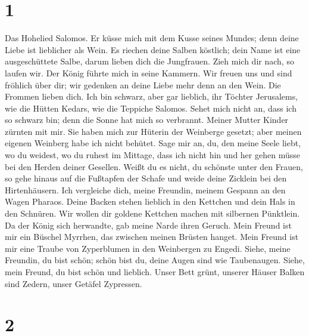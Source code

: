 \hypertarget{section}{%
\section{1}\label{section}}

 Das Hohelied Salomos.  Er küsse mich mit
dem Kusse seines Mundes; denn deine Liebe ist lieblicher als Wein.
 Es riechen deine Salben köstlich; dein Name ist eine
ausgeschüttete Salbe, darum lieben dich die Jungfrauen. 
Zieh mich dir nach, so laufen wir. Der König führte mich in seine
Kammern. Wir freuen uns und sind fröhlich über dir; wir gedenken an
deine Liebe mehr denn an den Wein. Die Frommen lieben dich.
 Ich bin schwarz, aber gar lieblich, ihr Töchter
Jerusalems, wie die Hütten Kedars, wie die Teppiche Salomos.
 Sehet mich nicht an, dass ich so schwarz bin; denn die
Sonne hat mich so verbrannt. Meiner Mutter Kinder zürnten mit mir. Sie
haben mich zur Hüterin der Weinberge gesetzt; aber meinen eigenen
Weinberg habe ich nicht behütet.  Sage mir an, du, den
meine Seele liebt, wo du weidest, wo du ruhest im Mittage, dass ich
nicht hin und her gehen müsse bei den Herden deiner Gesellen.
 Weißt du es nicht, du schönste unter den Frauen, so gehe
hinaus auf die Fußtapfen der Schafe und weide deine Zicklein bei den
Hirtenhäusern.  Ich vergleiche dich, meine Freundin,
meinem Gespann an den Wagen Pharaos.  Deine Backen stehen
lieblich in den Kettchen und dein Hals in den Schnüren. 
Wir wollen dir goldene Kettchen machen mit silbernen Pünktlein.
 Da der König sich herwandte, gab meine Narde ihren
Geruch.  Mein Freund ist mir ein Büschel Myrrhen, das
zwischen meinen Brüsten hanget.  Mein Freund ist mir eine
Traube von Zyperblumen in den Weinbergen zu Engedi. 
Siehe, meine Freundin, du bist schön; schön bist du, deine Augen sind
wie Taubenaugen.  Siehe, mein Freund, du bist schön und
lieblich. Unser Bett grünt,  unserer Häuser Balken sind
Zedern, unser Getäfel Zypressen.

\hypertarget{section-1}{%
\section{2}\label{section-1}}

